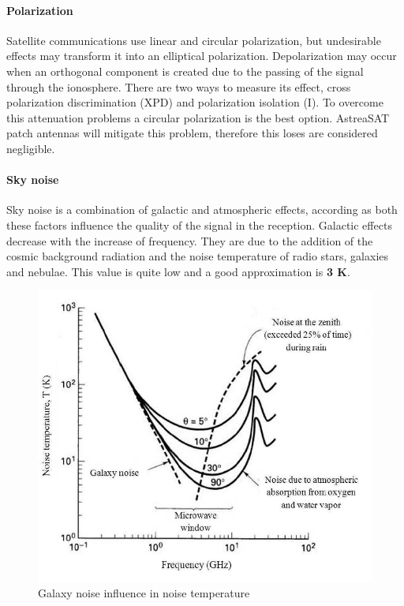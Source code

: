 \paragraph{Polarization} Satellite communications use linear and circular polarization, but undesirable effects may transform it into an elliptical polarization. Depolarization may occur when an orthogonal component is created due to the passing of the signal through the ionosphere. There are two ways to measure its effect, cross polarization discrimination (XPD) and polarization isolation (I)\cite{Jorge2012}. To overcome this attenuation problems a circular polarization is the best option. AstreaSAT patch antennas will mitigate this problem, therefore this loses are considered negligible.

\paragraph{Sky noise} Sky noise is a combination of galactic and atmospheric effects, according as both these factors influence the quality of the signal in the reception. Galactic effects decrease with the increase of frequency. They are due to the addition of the cosmic background radiation and the noise temperature of radio stars, galaxies and nebulae. This value is quite low and a good approximation is \textbf{3 K}.

\begin{figure}[H]
	\includegraphics[scale=0.5]{./sections/SatelliteDept/sections/images/NoiseTemperature}
	\centering
	\caption[Galaxy noise influence in noise temperature]{Galaxy noise influence in noise temperature \cite{Jorge2012}}
	\label{NoiseTemperature}
\end{figure}

